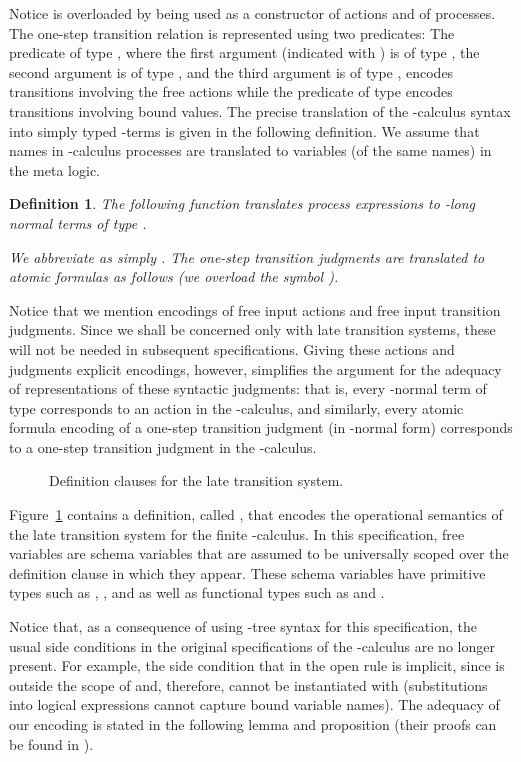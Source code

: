 \documentclass{acmtrans2m}
\newenvironment{definition}{\begin{define} \rm}{\end{define}}
\newtheorem{define}[theorem]{Definition}
\begin{document}
Notice  is overloaded by being used as a constructor
of actions and of processes.
The one-step transition relation is represented using two predicates:
The predicate  of type
, where the first argument (indicated with )
is of type , the second argument is of type , and
the third argument is of type , 
encodes transitions involving the free actions while the 
predicate  of type
 encodes transitions
involving bound values.  The precise translation of the -calculus
syntax into simply typed -terms is given in the following
definition. We assume that names in -calculus processes are
translated to variables (of the same names) in the meta logic. 


\begin{definition}
The following function  translates process expressions
to -long normal terms of type . 

We abbreviate  as simply .  
The one-step transition judgments are translated to atomic
formulas as follows (we overload the symbol ).

\end{definition}

Notice that we mention encodings of free input actions and free input transition
judgments. Since we shall be concerned only with late transition systems, these 
will not be needed in subsequent specifications.  Giving these actions
and judgments explicit encodings, however, simplifies the argument for the adequacy of
representations of these syntactic judgments: that is, every
-normal term
of type  corresponds to an action in the -calculus, and similarly, every
atomic formula encoding of a one-step transition judgment (in -normal form) 
corresponds to a one-step transition judgment in the -calculus.


\begin{figure}

\caption{Definition clauses for the late transition system.}
\label{late pi def}
\end{figure}

Figure~\ref{late pi def} contains a definition, called ,
that encodes the operational semantics of the late transition system
for the finite -calculus.
In this specification, free variables are schema
variables that are assumed to be universally scoped over the 
definition clause in which they appear.  These schema
variables have primitive types such as , , and 
as well as functional types such as  and
.  

Notice that, as a consequence of using -tree syntax for this
specification, the usual side conditions in the original specifications of
the -calculus \cite{milner92icII} are no longer present. 
For example, the side condition that  in
the open rule is implicit, since  is outside the scope of  and, therefore,
cannot be instantiated with  (substitutions into logical
expressions cannot capture bound variable names).
The adequacy of our encoding is stated in the following lemma and 
proposition (their proofs can be found in \cite{tiu04phd}).
\end{document}
